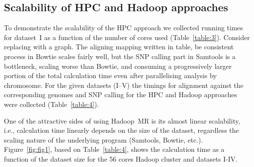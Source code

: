 \documentclass[11pt, oneside]{article}   	%
\newcommand{\COMMENT}[1]{{\color{red} #1 }}
\begin{document}
\subsection{Scalability of HPC and Hadoop approaches}
To demonstrate the scalability of the HPC approach we collected running times for dataset~I as a function of the number of cores used (Table~\ref{table:3}). \COMMENT{Consider replacing with a graph.}
The aligning \COMMENT{mapping written in table, be consistent} process in Bowtie scales fairly well, but the SNP calling part in Samtools is a bottleneck, scaling worse than Bowtie, and consuming a progressively larger portion of the total calculation time even after parallelising analysis by chromosome.
For the given datasets (I--V) the timings for alignment against the corresponding genomes and SNP calling for the HPC and Hadoop approaches were collected (Table~\ref{table:4}).

One of the attractive sides of using Hadoop~MR is its almost linear scalability, i.e., calculation time linearly depends on the size of the dataset\cite{crossbow,seal}, regardless the scaling nature of the underlying program (Samtools, Bowtie, etc.).
Figure~\ref{fig:fig1}, based on Table~\ref{table:4}, shows the calculation time as a function of the dataset size for the 56 cores Hadoop cluster and datasets I-IV.
\end{document}
